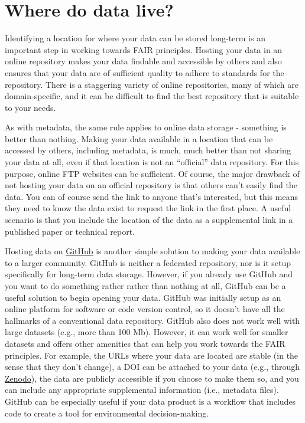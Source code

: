 \documentclass[
]{book}
\begin{document}
\hypertarget{datahome}{%
\section{Where do data live?}\label{datahome}}

Identifying a location for where your data can be stored long-term is an important step in working towards FAIR principles. Hosting your data in an online repository makes your data findable and accessible by others and also ensures that your data are of sufficient quality to adhere to standards for the repository. There is a staggering variety of online repositories, many of which are domain-specific, and it can be difficult to find the best repository that is suitable to your needs.

As with metadata, the same rule applies to online data storage - something is better than nothing. Making your data available in a location that can be accessed by others, including metadata, is much, much better than not sharing your data at all, even if that location is not an ``official'' data repository. For this purpose, online FTP websites can be sufficient. Of course, the major drawback of not hosting your data on an official repository is that others can't easily find the data. You can of course send the link to anyone that's interested, but this means they need to know the data exist to request the link in the first place. A useful scenario is that you include the location of the data as a supplemental link in a published paper or technical report.

Hosting data on \href{https://github.com/}{GitHub} is another simple solution to making your data available to a larger community. GitHub is neither a federated repository, nor is it setup specifically for long-term data storage. However, if you already use GitHub and you want to do something rather rather than nothing at all, GitHub can be a useful solution to begin opening your data. GitHub was initially setup as an online platform for software or code version control, so it doesn't have all the hallmarks of a conventional data repository. GitHub also does not work well with large datasets (e.g., more than 100 Mb). However, it can work well for smaller datasets and offers other amenities that can help you work towards the FAIR principles. For example, the URLs where your data are located are stable (in the sense that they don't change), a DOI can be attached to your data (e.g., through \href{https://zenodo.org/}{Zenodo}), the data are publicly accessible if you choose to make them so, and you can include any appropriate supplemental information (i.e., metadata files). GitHub can be especially useful if your data product is a workflow that includes code to create a tool for environmental decision-making.
\end{document}
